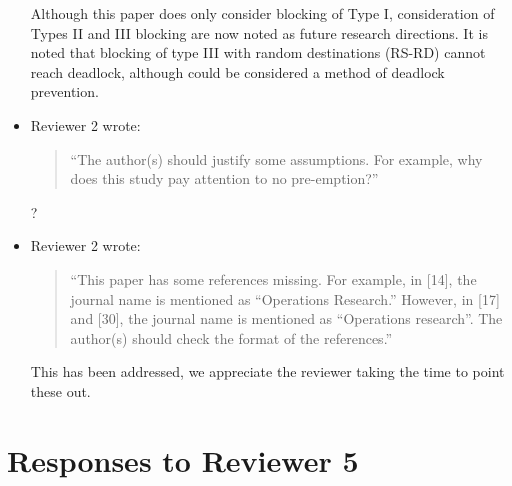 \documentclass{article}
\begin{document}
\begin{itemize}
Although this paper does only consider blocking of Type I, consideration of
Types II and III blocking are now noted as future research directions.
It is noted that blocking of type III with random destinations (RS-RD) cannot
reach deadlock, although could be considered a method of deadlock prevention.

\item Reviewer 2 wrote:
\begin{quote}
``The author(s) should justify some assumptions.
For example, why does this study pay attention to no pre-emption?''
\end{quote}
?

\item Reviewer 2 wrote:
\begin{quote}
``This paper has some references missing.
For example, in [14], the journal name is mentioned as “Operations Research.”
However, in [17] and [30], the journal name is mentioned as “Operations
research”. The author(s) should check the format of the references.''
\end{quote}

This has been addressed, we appreciate the reviewer taking the time to point
these out.

\end{itemize}



\section*{Responses to Reviewer 5}
\end{document}
